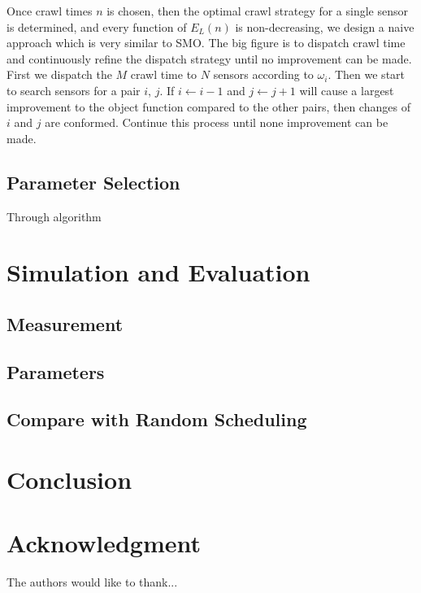 \documentclass[conference]{IEEEtran}
\begin{document}
Once crawl times $n$ is chosen, then the optimal crawl strategy for a single sensor is determined, and every function of $E_L(n)$ is non-decreasing,  we design a naive approach which is very similar to SMO\cite{Platt1998}. 
The big figure is to dispatch crawl time and continuously refine the dispatch strategy until no improvement can be made.
First we dispatch the $M$ crawl time to $N$ sensors according to $\omega_i$. Then we start to search sensors for a pair $i$, $j$. If $i\gets i-1$ and $j\gets j+1$ will cause a largest improvement to the object function compared to the other pairs, then changes of $i$ and $j$ are conformed. Continue this process until none improvement can be made.


\subsection{Parameter Selection}
Through algorithm 



\section{Simulation and Evaluation}


\subsection{Measurement}

\subsection{Parameters}

\subsection{Compare with Random Scheduling}


\section{Conclusion}


\section*{Acknowledgment}


The authors would like to thank...


\ifCLASSOPTIONcaptionsoff
  \newpage
\fi
\end{document}
